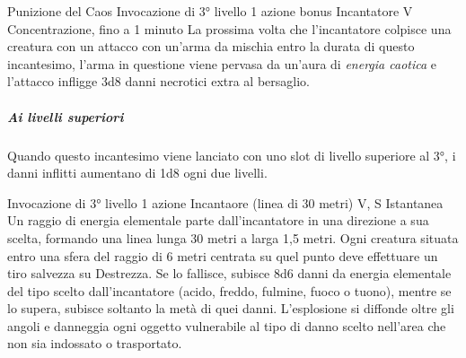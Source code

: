\DndSpellHeader%
  {Punizione del Caos}
  {Invocazione di 3° livello}
  {1 azione bonus}
  {Incantatore}
  {V}
  {Concentrazione, fino a 1 minuto}
La prossima volta che l'incantatore colpisce una creatura con un attacco con un'arma da mischia entro la durata di questo incantesimo, l'arma in questione viene pervasa da un'aura di \textit{energia caotica} e l'attacco infligge 3d8 danni necrotici extra al bersaglio. 
\subparagraph{Ai livelli superiori}Quando questo incantesimo viene lanciato con uno slot di livello superiore al 3°, i danni inflitti aumentano di 1d8 ogni due livelli.

{Invocazione di 3° livello}
{1 azione}
{Incantaore (linea di 30 metri)}
{V, S}
{Istantanea}
Un raggio di energia elementale parte dall'incantatore in una direzione a sua scelta, formando una linea lunga 30 metri a larga 1,5 metri. Ogni creatura situata entro una sfera del raggio di 6 metri centrata su quel punto deve effettuare un tiro salvezza su Destrezza. Se lo fallisce, subisce 8d6 danni da  energia elementale del tipo scelto dall'incantatore (acido, freddo, fulmine, fuoco o tuono), mentre se lo supera, subisce soltanto la metà di quei danni. 
L'esplosione si diffonde oltre gli angoli e danneggia ogni oggetto vulnerabile al tipo di danno scelto nell'area che non sia indossato o trasportato.

